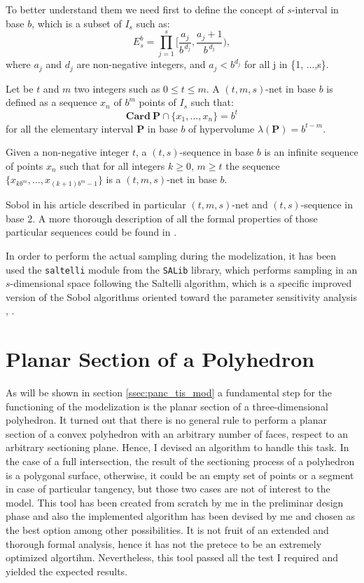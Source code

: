     To better understand them we need first to define the concept of $s$-interval in base $b$, which is a subset of $I_s$ such as:
    \begin{equation}
        E_s^b = \prod_{j=1}^{s} \Bigg[ \frac{a_j}{b^{\,d_j}}, \frac{a_j + 1}{b^{\,d_j}}\Bigg),
    \end{equation}
    where $a_j$ and $d_j$ are non-negative integers, and $a_j < b^{d_j}$ for all j in \{1, ...,s\}.

    Let be $t$ and $m$ two integers such as $0 \leq t \leq m$. A $(t,m,s)$-net in base $b$ is defined as a sequence $x_n$ of $b^m$ points of $I_s$ such that:
    \begin{equation}
        \mathbf{Card} \ \mathbf{P} \cap \{x_1, \dots, x_n \} = b^t
    \end{equation}
    for all the elementary  interval $\mathbf{P}$ in base $b$ of hypervolume $\lambda(\mathbf{P}) =  b^{t-m}$.

    Given a non-negative integer $t$, a $(t,s)$-sequence in base $b$ is an infinite sequence of points $x_n$ such that for all integers $k \geq 0$, $m \geq t$ the sequence $ \{ x_{kb^m}, \dots, x_{(k+1)b^m-1} \}$ is a $(t,m,s)$-net in base $b$.

    Sobol in his article described in particular $(t,m,s)$-net and $(t,s)$-sequence in base 2. A more thorough description of all the formal properties of those particular sequences could be found in \cite{SOBOL1976236}.

    In order to perform the actual sampling during the modelization, it has been used the \texttt{saltelli} module from the \texttt{SALib} library, which performs sampling in an $s$-dimensional space following the Saltelli algorithm, which is a specific improved version of the Sobol algorithms oriented toward the parameter sensitivity analysis \cite{SALTELLI2002280}, \cite{SALTELLI2010259}.

\section{Planar Section of a Polyhedron} \label{ssec:pol_sec}
    As will be shown in section \ref{ssec:panc_tis_mod} a fundamental step for the functioning of the modelization is the planar section of a three-dimensional polyhedron. It turned out that there is no general rule to perform a planar section of a convex polyhedron with an arbitrary number of faces, respect to an arbitrary sectioning plane. Hence, I devised an algorithm to handle this task. In the case of a full intersection, the result of the sectioning process of a polyhedron is a polygonal surface, otherwise, it could be an empty set of points or a segment in case of particular tangency, but those two cases are not of interest to the model. This tool has been created from scratch by me in the preliminar design phase and also the implemented algorithm has been devised by me and chosen as the best option among other possibilities. It is not fruit of an extended and thorough formal analysis, hence it has not the pretece to be an extremely optimized algortihm. Nevertheless, this tool passed all the test I required and yielded the expected results.


